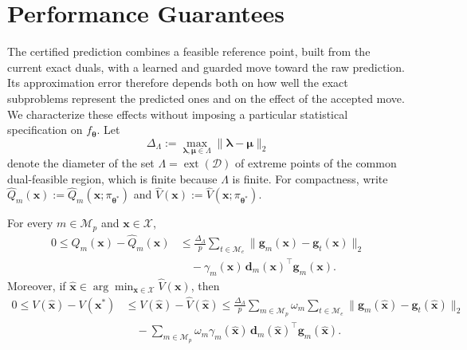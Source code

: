 \section{Performance Guarantees}\label{sec:theory}

The certified prediction combines a feasible reference point, built from the current exact duals, with a learned and guarded move toward the raw prediction. Its approximation error therefore depends both on how well the exact subproblems represent the predicted ones and on the effect of the accepted move. We characterize these effects without imposing a particular statistical specification on $f_{\boldsymbol\theta}$. Let
\begin{equation}\label{eq:diameter}
\Delta_\Lambda:=\max_{\boldsymbol\lambda,\boldsymbol\mu\in\Lambda}\|\boldsymbol\lambda-\boldsymbol\mu\|_2
\end{equation}
denote the diameter of the set $\Lambda=\operatorname{ext}(\mathcal D)$ of extreme points of the common dual-feasible region, which is finite because $\Lambda$ is finite. For compactness, write $\widehat Q_m(\mathbf x):=\widehat Q_m(\mathbf x;\pi_{\boldsymbol\theta^*})$ and $\widehat V(\mathbf x):=\widehat V(\mathbf x;\pi_{\boldsymbol\theta^*})$.

\begin{theorem}\label{thm:performance}
For every $m\in\mathcal M_p$ and $\mathbf x\in\mathcal X$,
\begin{equation}\label{eq:recourse-bound}
\begin{aligned}
0\le Q_m(\mathbf x)-\widehat Q_m(\mathbf x)
&\le\frac{\Delta_\Lambda}{p}\sum_{t\in\mathcal M_e}\bigl\|\mathbf g_m(\mathbf x)-\mathbf g_t(\mathbf x)\bigr\|_2\\
&\quad-\gamma_m(\mathbf x)\,\mathbf d_m(\mathbf x)^\top\mathbf g_m(\mathbf x).
\end{aligned}
\end{equation}
Moreover, if $\widehat{\mathbf x}\in\arg\min_{\mathbf x\in\mathcal X}\widehat V(\mathbf x)$, then
\begin{equation*}\label{eq:gap-bound}
\begin{aligned}
0\le V(\widehat{\mathbf x})-V(\mathbf x^*)
&\le V(\widehat{\mathbf x})-\widehat V(\widehat{\mathbf x})
\le\frac{\Delta_\Lambda}{p}\sum_{m\in\mathcal M_p}\omega_m\sum_{t\in\mathcal M_e}\bigl\|\mathbf g_m(\widehat{\mathbf x})-\mathbf g_t(\widehat{\mathbf x})\bigr\|_2\\
&\quad-\sum_{m\in\mathcal M_p}\omega_m\gamma_m(\widehat{\mathbf x})\,\mathbf d_m(\widehat{\mathbf x})^\top\mathbf g_m(\widehat{\mathbf x}).
\end{aligned}
\end{equation*}
\end{theorem}


